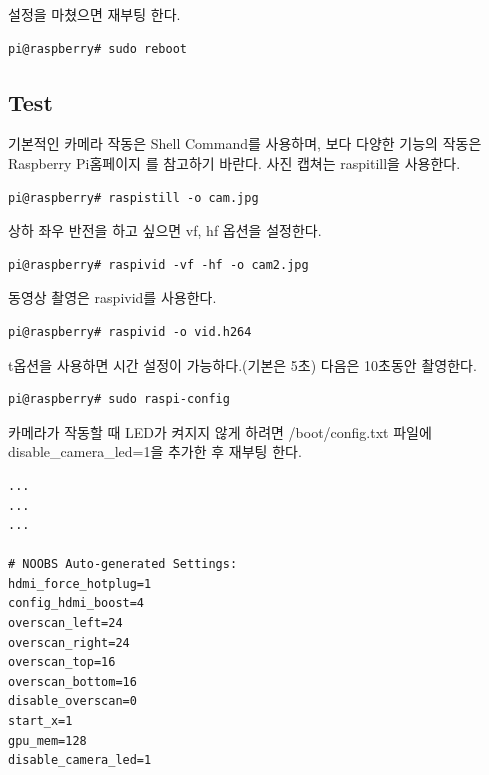 \documentclass[11pt
  , a4paper
  , article
  , oneside
]{memoir}
\begin{document}
설정을 마쳤으면 재부팅 한다.
\begin{lstlisting}[style=termstyle]
pi@raspberry# sudo reboot
\end{lstlisting}
\subsection{Test}
기본적인 카메라 작동은 Shell Command를 사용하며, 보다 다양한 기능의 작동은 Raspberry Pi홈페이지
\cite{PICAM}를 참고하기 바란다.
사진 캡쳐는 raspitill을 사용한다.
\begin{lstlisting}[style=termstyle]
pi@raspberry# raspistill -o cam.jpg
\end{lstlisting}
상하 좌우 반전을 하고 싶으면 vf, hf 옵션을 설정한다.
\begin{lstlisting}[style=termstyle]
pi@raspberry# raspivid -vf -hf -o cam2.jpg
\end{lstlisting}
동영상 촬영은 raspivid를 사용한다.
\begin{lstlisting}[style=termstyle]
pi@raspberry# raspivid -o vid.h264
\end{lstlisting}
t옵션을 사용하면 시간 설정이 가능하다.(기본은 5초) 다음은 10초동안 촬영한다.
\begin{lstlisting}[style=termstyle]
pi@raspberry# sudo raspi-config
\end{lstlisting}
카메라가 작동할 때 LED가 켜지지 않게 하려면 /boot/config.txt 파일에 disable\_camera\_led=1을 
추가한 후 재부팅 한다.
\begin{lstlisting}[style=termstyle]
...
...
...

# NOOBS Auto-generated Settings:
hdmi_force_hotplug=1
config_hdmi_boost=4
overscan_left=24
overscan_right=24
overscan_top=16
overscan_bottom=16
disable_overscan=0
start_x=1
gpu_mem=128
disable_camera_led=1
\end{lstlisting}
\end{document}
